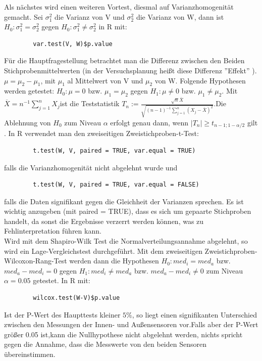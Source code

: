 \documentclass[ ngerman, fontsize= 12pt, paper=a4, headings=big, titlepage=true]{article}
\begin{document}
	Als nächstes wird einen weiteren Vortest, diesmal auf Varianzhomogenität gemacht. Sei $\sigma^2_1 $ die Varianz von V und $\sigma^2_2 $ die Varianz von W, dann ist  
	$ H_0: \sigma^2_1 = \sigma^2_2  $ gegen $ H_0: \sigma^2_1 \neq \sigma^2_2  $ in R mit: \begin{lstlisting}
		var.test(V, W)$p.value
	\end{lstlisting}
	Für die Hauptfragestellung betrachtet man die Differenz zwischen den Beiden Stichprobenmittelwerten (in der Versuchsplanung heißt diese Differenz ''Effekt'' \cite{1}).
	$\mu = \mu_2 - \mu_1 $, mit $ \mu_1 $ al Mittelwert von V und $ \mu_2 $ von W. Folgende Hypothesen werden getestet:
	$ H_0: \mu = 0 $ bzw. $ \mu_1 = \mu_2 $ gegen $ H_1: \mu \neq 0 $ bzw. $ \mu_1 \neq \mu_2 $. Mit $ \overline{X}= n^{-1}\sum^n_{j=1}X_j $ist die Teststatistik 
	$ T_n := \frac{\sqrt{n}\overline{X}}{\sqrt{(n-1)^{-1}\sum^n_{j = 1} (X_j - \overline{X}) ^2}} $.Die Ablehnung von $H_0 $ zum Niveau $\alpha $ erfolgt genau dann, wenn $ |T_n| \geq t_{n-1;1-\alpha/2} $ gilt \cite{2}. In R verwendet man den zweiseitigen Zweistichproben-t-Test: 
	\begin{lstlisting}
		t.test(W, V, paired = TRUE, var.equal = TRUE)
	\end{lstlisting}
	falls die Varianzhomogenität nicht abgelehnt wurde und 
	\begin{lstlisting}
		t.test(W, V, paired = TRUE, var.equal = FALSE)
	\end{lstlisting} falls die Daten signifikant gegen die Gleichheit der Varianzen sprechen. Es ist wichtig anzugeben (mit paired = TRUE), dass es sich um gepaarte Stichproben handelt, da sonst die Ergebnisse verzerrt werden können, was zu Fehlinterpretation führen kann.\\

	Wird mit dem Shapiro-Wilk Test die Normalverteilungsannahme abgelehnt, so wird ein Lage-Vergleichstest durchgeführt. Mit dem zweiseitigen Zweistichproben-Wilcoxon-Rang-Test werden dann die Hypothesen $ H_0: med_i = med_a $ bzw. $ med_a - med_i = 0 $ gegen $H_1: med_i \neq med_a $ bzw. $ med_a - med_i \neq 0 $ zum Niveau $\alpha = 0.05 $ getestet. In R mit: \begin{lstlisting}
		wilcox.test(W-V)$p.value
	\end{lstlisting}

	Ist der P-Wert des Haupttests kleiner $5\% $, so liegt einen signifikanten Unterschied zwischen den Messungen der Innen- und Außensensoren vor.Falls aber der P-Wert größer 0.05 ist,kann die Nullhypothese nicht abgelehnt werden, nichts spricht gegen die Annahme, dass die Messwerte von den beiden Sensoren übereinstimmen. \\
	
\end{document}
